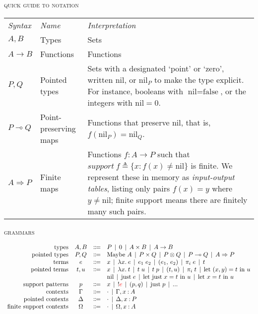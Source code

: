 \documentclass{article}
\newcommand\G\Gamma
\newcommand\D\Delta
\renewcommand\O\Omega
\newcommand\lto\multimap        %
\newcommand\fto{\Rightarrow}
\newcommand\tmaybe[1]{\ensuremath{{#1}_{*}}}
\renewcommand\tmaybe[1]{\ensuremath{\text{Maybe}~{#1}}}
\newcommand\bnfeq{\Coloneqq}
\newcommand\bnfor{\mathrel{\,|\,}}
\newcommand\emptycx{{\cdot}}
\newcommand\hyp[2]{{#1} \of {#2}}
\newcommand\of{\mathbin{:}}
\newcommand\fname\textit        %
\newcommand\cname\text          %
\newcommand\fnspace\:           %
\newcommand\fn[1]{\lambda{#1}.\fnspace}
\newcommand\<\;                 %
\newcommand\cnil{\cname{nil}}
\newcommand\cjust{\cname{just}}
\newcommand\tnil{\cnil}
\newcommand\tjust[1]{\cjust\<{#1}}
\newcommand\letin[2]{\text{let}~{#1}~\text{in}~{#2}}
\newcommand\leteq[3]{\letin{{#1} = {#2}}{#3}}
\newcommand\letjust[3]{\leteq{\tjust {#1}}{#2}{#3}}
\newcommand\letpair[4]{\leteq{({#1}, {#2})}{#3}{#4}}
\newcommand\peq{{!}}
\begin{document}

\noindent\textsc{quick guide to notation}

\newcommand\support{\ensuremath{\fname{support}}}
\newcommand\supportof[1]{\ensuremath{\support~{#1}}}
\newcommand\defeq{\triangleq}

\begin{tabular}{llp{10cm}}%
  \it Syntax & \it Name & \it Interpretation\\
  $A,B$ & Types & Sets\\
  $A \to B$ & Functions & Functions\\
  $P,Q$ & Pointed types & Sets with a designated `point' or `zero', written $\tnil$, or $\tnil_P$ to make the type explicit.
  For instance, booleans with $\tnil = \text{false}$, or the integers with $\tnil = 0$.
  \\
  $P \lto Q$ & Point-preserving maps & Functions that preserve $\tnil$, that is, $f(\tnil_P) = \tnil_Q$.
  \\
  $A \fto P$ & Finite maps &
  Functions $f : A \to P$ such that $\supportof{f} \defeq \{ x : f(x) \ne \tnil \}$ is finite.
  We represent these in memory as \emph{input-output tables}, listing only pairs $f(x) = y$ where $y \ne \tnil$; finite support means there are finitely many such pairs.
\end{tabular}


\noindent
\textsc{grammars}

\[
\begin{array}{rccl}
  \text{types} & A,B &\bnfeq&
  P \bnfor 0 \bnfor A \times B \bnfor A \to B
  \\
  \text{pointed types} & P,Q &\bnfeq&
  \tmaybe A \bnfor P \times Q \bnfor P \otimes Q
  \bnfor P \lto Q
  \bnfor A \fto P
  \\
  \text{terms} & e &\bnfeq& x \bnfor \fn{x} e \bnfor e_1\<e_2
  \bnfor (e_1,\, e_2) \bnfor \pi_i \<e \bnfor t
  \\
  \text{pointed terms} & t,u &\bnfeq&
  x \bnfor \fn{x} t \bnfor t \< u \bnfor t \< p
  \bnfor (t,u) \bnfor \pi_i \<t \bnfor \letpair{x}{y}{t}{u}
  \\
  &&&
  \tnil \bnfor \tjust e
  \bnfor \letjust x t u         %
  \bnfor \leteq x t u
  \\
  \text{support patterns} & p &\bnfeq& x
  \bnfor \peq {\color{red} e}   %
  \bnfor (p,q) \bnfor \tjust p \bnfor ...
  \\
  \text{contexts} & \G &\bnfeq& \emptycx \bnfor \G, \hyp x A
  \\
  \text{pointed contexts} & \D &\bnfeq& \emptycx \bnfor \D, \hyp x P
  \\
  \text{finite support contexts} & \O &\bnfeq& \emptycx \bnfor \O, \hyp x A
  \\
\end{array}
\]
\end{document}
